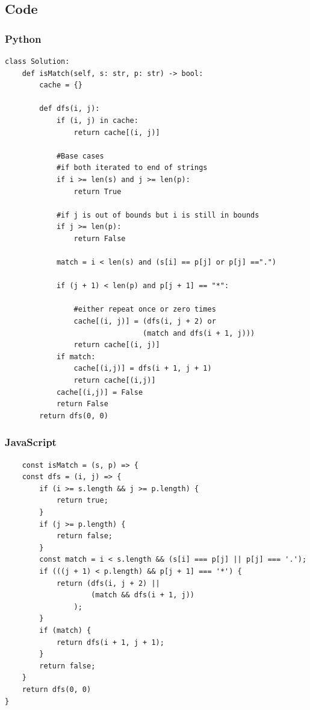 \subsection*{Code}
\subsubsection*{Python}
\begin{verbatim}
class Solution:
    def isMatch(self, s: str, p: str) -> bool:
        cache = {}

        def dfs(i, j):
            if (i, j) in cache:
                return cache[(i, j)]

            #Base cases
            #if both iterated to end of strings
            if i >= len(s) and j >= len(p):
                return True

            #if j is out of bounds but i is still in bounds
            if j >= len(p):
                return False

            match = i < len(s) and (s[i] == p[j] or p[j] ==".")

            if (j + 1) < len(p) and p[j + 1] == "*":

                #either repeat once or zero times
                cache[(i, j)] = (dfs(i, j + 2) or
                                (match and dfs(i + 1, j)))
                return cache[(i, j)]
            if match:
                cache[(i,j)] = dfs(i + 1, j + 1)
                return cache[(i,j)]
            cache[(i,j)] = False
            return False
        return dfs(0, 0)
\end{verbatim}

\subsubsection*{JavaScript}
\begin{verbatim}
    const isMatch = (s, p) => {
    const dfs = (i, j) => {
        if (i >= s.length && j >= p.length) {
            return true;
        }
        if (j >= p.length) {
            return false;
        }
        const match = i < s.length && (s[i] === p[j] || p[j] === '.');
        if (((j + 1) < p.length) && p[j + 1] === '*') {
            return (dfs(i, j + 2) ||
                    (match && dfs(i + 1, j))
                );
        }
        if (match) {
            return dfs(i + 1, j + 1);
        }
        return false;
    }
    return dfs(0, 0)
}
\end{verbatim}


